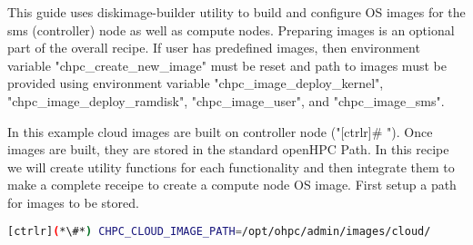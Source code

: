 

   This guide uses diskimage-builder utility to build and configure OS images 
for the sms (controller) node as well as compute nodes.  Preparing images is 
an optional part of the overall recipe. If user has predefined images, then 
environment variable "chpc\_create\_new\_image" must be reset and 
path to images must be provided using environment variable "chpc\_image\_deploy\_kernel", "chpc\_image\_deploy\_ramdisk",
"chpc\_image\_user", and "chpc\_image\_sms". 

In this example cloud images are built on controller node ("[ctrlr]\# "). Once images are built, they are stored in the standard openHPC Path.
In this recipe we will create utility functions for each functionality and then integrate them to make a complete receipe to create a compute node OS image. First setup a path for images to be stored.


\begin{lstlisting}[language=bash,keywords={},upquote=true]
[ctrlr](*\#*) CHPC_CLOUD_IMAGE_PATH=/opt/ohpc/admin/images/cloud/
\end{lstlisting}
